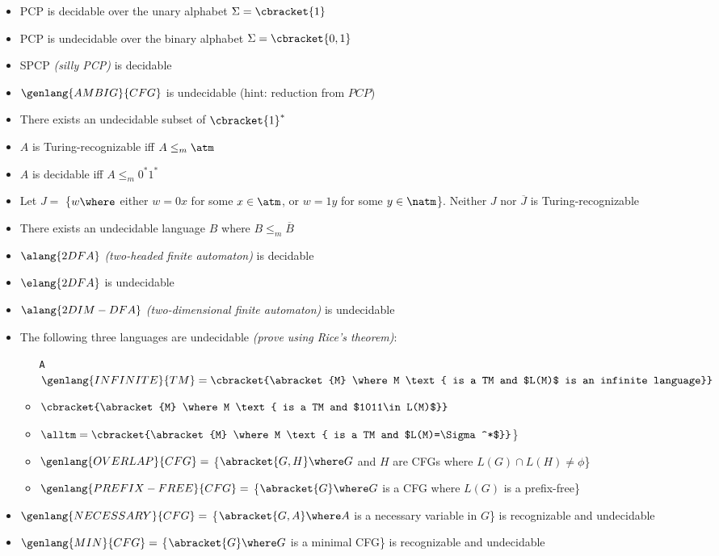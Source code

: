 \documentclass[12pt]{article} %
\newenvironment{theoremlist} {
    \begin{enumerate}[nosep,leftmargin=*,label={}]
} {
    \end{enumerate}
}
\begin{document}
\begin{theoremlist}
\begin{itemize}[nosep]
        \color{gray}
        \item PCP is decidable over the unary alphabet $\Sigma=\cbracket{1}$
        \item PCP is undecidable over the binary alphabet $\Sigma=\cbracket{0,1}$
        \item SPCP \textit{(silly PCP)} is decidable
        \item $\genlang{AMBIG}{CFG}$ is undecidable (hint: reduction from $\mathit{PCP}$)
        \color{black}
        \item There exists an undecidable subset of $\cbracket{1}^*$
        \item $A$ is Turing-recognizable iff $A\leq_m \atm$
        \item $A$ is decidable iff $A\leq_m 0^* 1^*$
        \item Let $J=$ \{$w \where$ either $w=0x$ for some $x\in\atm$, or $w=1y$ for some $y\in\natm$\}.
        Neither $J$ nor $\overline{J}$ is Turing-recognizable
        \item There exists an undecidable language $B$ where $B\leq_m\overline{B}$
        \item $\alang{2DFA}$ \textit{(two-headed finite automaton)} is decidable
        \item $\elang{2DFA}$ is undecidable
        \item $\alang{2DIM-DFA}$ \textit{(two-dimensional finite automaton)} is undecidable
        \vspace{0.25em}
        \item The following three languages are undecidable \textit{(prove using Rice's theorem)}:
        \begin{itemize}[label=-]
            \item[\texttt{A}] $\genlang{INFINITE}{TM}=\cbracket{\abracket{M} \where M \text{ is a TM and $L(M)$ is an infinite language}}$
            \item $\cbracket{\abracket{M} \where M \text{ is a TM and $1011\in L(M)$}}$
            \item $\alltm=\cbracket{\abracket{M} \where M \text{ is a TM and $L(M)=\Sigma ^*$}}$\}
            \item $\genlang{OVERLAP}{CFG}=$ \{$\abracket{G,H} \where G$ and $H$ are CFGs where $L(G)\cap L(H) \neq \phi$\}
            \item $\genlang{PREFIX-FREE}{CFG}=$ \{$\abracket{G} \where G$ is a CFG where $L(G)$ is a prefix-free\}
        \end{itemize}
        \item $\genlang{NECESSARY}{CFG}=$ \{$\abracket{G,A} \where A$ is a necessary variable in $G$\} is recognizable and undecidable
        \item $\genlang{MIN}{CFG}=$ \{$\abracket{G} \where G$ is a minimal CFG\} is recognizable and undecidable
    \end{itemize}


\end{theoremlist}
\end{document}
